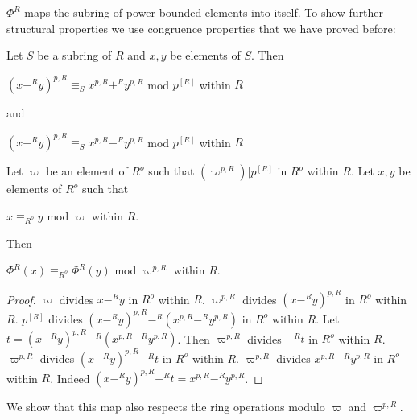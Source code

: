 \documentclass[11pt]{article}
\begin{document}
$\Phi^{R}$ maps the subring of power-bounded elements into itself.
To show further structural properties we use congruence properties that
we have proved before:

\begin{lemma*}
Let $S$ be a subring of $R$ and $x,y$ be elements of $S$.
Then 

$(x +^{R} y)^{p,R} \equiv_{S} 
x^{p,R} +^{R} y^{p,R}$ mod $p^{[R]}$ within $R$ 

and

$(x -^{R} y)^{p,R} \equiv_{S} 
x^{p,R} -^{R} y^{p,R}$ mod $p^{[R]}$ within $R$ 
\end{lemma*}

\begin{forthel}

\begin{lemma}Let $\varpi$ be an element of $R^o$ such that
$(\varpi^{p,R}) | p^{[R]}$ in $R^o$ within $R$.
Let $x,y$ be elements of $R^o$ such that

$x \equiv_{R^o} y$ mod $\varpi$ within $R$.

Then 

$\Phi^{R}(x) \equiv_{R^o} \Phi^{R}(y)$ mod $\varpi^{p,R}$ within $R$.
\end{lemma}
\begin{proof}
$\varpi$ divides $x -^{R} y$ in $R^o$ within $R$.
$\varpi^{p,R}$ divides $(x -^{R} y)^{p,R}$ in $R^o$ within $R$.
$p^{[R]}$ divides $(x -^{R} y)^{p,R} -^{R} (x^{p,R} -^{R} y^{p,R})$ in $R^o$ within $R$.
Let $t = (x -^{R} y)^{p,R} -^{R} (x^{p,R} -^{R} y^{p,R})$.
Then $\varpi^{p,R}$ divides $-^{R} t$ in $R^o$ within $R$.
$\varpi^{p,R}$ divides $(x -^{R} y)^{p,R} -^{R} t$ in $R^o$ within $R$.
$\varpi^{p,R}$ divides $x^{p,R} -^{R} y^{p,R}$ in $R^o$ within $R$.
Indeed $(x -^{R} y)^{p,R} -^{R} t = x^{p,R} -^{R} y^{p,R}$.
\end{proof}

\end{forthel}

We show that this map also respects the ring operations modulo 
$\varpi$ and $\varpi^{p,R}$.
\end{document}
